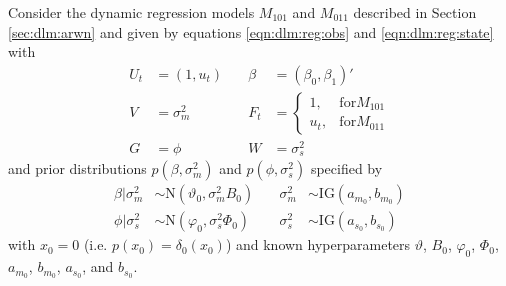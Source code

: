 Consider the dynamic regression models $M_{101}$ and $M_{011}$ described in Section \ref{sec:dlm:arwn} and given by equations \eqref{eqn:dlm:reg:obs} and \eqref{eqn:dlm:reg:state} with
\begin{align*}
U_t &= (1, u_t) &\quad \beta &= (\beta_0, \beta_1)' \\
V &= \sigma^2_m &\quad F_t &= \left\{\begin{array}{ll} 1, & \mbox{for} M_{101} \\ u_t, & \mbox{for} M_{011} \end{array}\right. \\
G &= \phi &\quad W &= \sigma^2_s
\end{align*}
and prior distributions $p(\beta,\sigma^2_m)$ and $p(\phi,\sigma^2_s)$ specified by
\begin{align}
\beta|\sigma^2_m &\sim \mbox{N}(\vartheta_0, \sigma^2_m B_0) &\quad \sigma^2_m &\sim \mbox{IG}(a_{m_0},b_{m_0}) \label{eqn:pl:prior:beta} \\
\phi|\sigma^2_s &\sim \mbox{N}(\varphi_0, \sigma^2_s \Phi_0) &\quad \sigma^2_s &\sim \mbox{IG}(a_{s_0},b_{s_0}) \label{eqn:pl:prior:phi}
\end{align}
with $x_0 = 0$ (i.e. $p(x_0) = \delta_0(x_0)$) and known hyperparameters $\vartheta$, $B_0$, $\varphi_0$, $\Phi_0$, $a_{m_0}$, $b_{m_0}$, $a_{s_0}$, and $b_{s_0}$.

